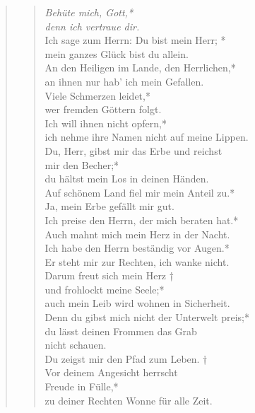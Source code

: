 

\begin{quote}
\begin{verse}


\smallskip
\textit{Behüte mich, Gott,*\\
denn ich vertraue dir.}\\ \vin
Ich sage zum Herrn: Du bist mein Herr; *\\ \vin
mein ganzes Glück bist du allein.\\
An den Heiligen im Lande, den Herrlichen,*\\
an ihnen nur hab’ ich mein Gefallen.\\ \vin
Viele Schmerzen leidet,*\\ \vin
wer fremden Göttern folgt.\\
Ich will ihnen nicht opfern,*\\
ich nehme ihre Namen nicht auf meine Lippen.\\ \vin
Du, Herr, gibst mir das Erbe und reichst\\ \vin  mir den Becher;*\\ \vin
du hältst mein Los in deinen Händen.\\
Auf schönem Land fiel mir mein Anteil zu.*\\
Ja, mein Erbe gefällt mir gut.\\ \vin
Ich preise den Herrn, der mich beraten hat.*\\ \vin
Auch mahnt mich mein Herz in der Nacht.\\
Ich habe den Herrn beständig vor Augen.*\\
Er steht mir zur Rechten, ich wanke nicht.\\ \vin
Darum freut sich mein Herz †\\ \vin
und frohlockt meine Seele;*\\ \vin
auch mein Leib wird wohnen in Sicherheit.\\
Denn du gibst mich nicht der Unterwelt preis;*\\
du lässt deinen Frommen das Grab\\ nicht schauen.\\ \vin
Du zeigst mir den Pfad zum Leben. †\\ \vin
Vor deinem Angesicht herrscht\\ \vin  Freude in Fülle,*\\ \vin
zu deiner Rechten Wonne für alle Zeit.\\

\end{verse}





\end{quote}
